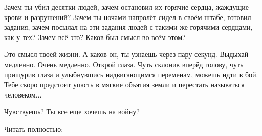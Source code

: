 Зачем ты убил десятки людей, зачем остановил их горячие сердца, жаждущие крови
и разрушений? Зачем ты ночами напролёт сидел в своём штабе, готовил задания,
зачем посылал на эти задания людей с такими же горячими сердцами, как у тех?
Зачем всё это? Каков был смысл во всём этом?

Это смысл твоей жизни. А каков он, ты узнаешь через пару секунд. Выдыхай
медленно. Очень медленно. Открой глаза. Чуть склонив вперёд голову, чуть
прищурив глаза и улыбнувшись надвигающимся переменам, можешь идти в бой. Тебе
скоро предстоит упасть в мягкие объятия земли и перестать называться
человеком...

Чувствуешь? Ты все еще хочешь на войну?

Читать полностью: 
